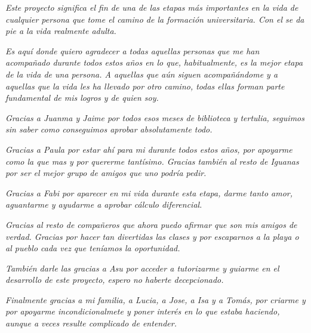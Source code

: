 \documentclass[12pt]{report} %
\begin{document}
\begin{flushright}


\textit{Este proyecto significa el fin de una de las etapas más importantes en la vida de cualquier persona que tome el camino de la formación universitaria. Con el se da pie a la vida realmente adulta.}

\textit{Es aquí donde quiero agradecer a todas aquellas personas que me han acompañado durante todos estos años en lo que, habitualmente, es la mejor etapa de la vida de una persona. A aquellas que aún siguen acompañándome y a aquellas que la vida les ha llevado por otro camino, todas ellas forman parte fundamental de mis logros y de quien soy.}

\textit{Gracias a Juanma y Jaime por todos esos meses de biblioteca y tertulia, seguimos sin saber como conseguimos aprobar absolutamente todo.}

\textit{Gracias a Paula por estar ahí para mi durante todos estos años, por apoyarme como la que mas y por quererme tantísimo. Gracias también al resto de Iguanas por ser el mejor grupo de amigos que uno podría pedir.}

\textit{Gracias a Fabi por aparecer en mi vida durante esta etapa, darme tanto amor, aguantarme y ayudarme a aprobar cálculo diferencial.}

\textit{Gracias al resto de compañeros que ahora puedo afirmar que son mis amigos de verdad. Gracias por hacer tan divertidas las clases y por escaparnos a la playa o al pueblo cada vez que teníamos la oportunidad.}

\textit{También darle las gracias a Asu por acceder a tutorizarme y guiarme en el desarrollo de este proyecto, espero no haberte decepcionado.}

\textit{Finalmente gracias a mi familia, a Lucia, a Jose, a Isa y a Tomás, por criarme y por apoyarme incondicionalmete y poner interés en lo que estaba haciendo, aunque a veces resulte complicado de entender.}


\end{flushright}

 
 \vfill
	
	\newpage %
	\thispagestyle{empty}
	\mbox{}
	


\tableofcontents
\thispagestyle{fancy}

\newpage %
\thispagestyle{empty}
\mbox{}
\end{document}
